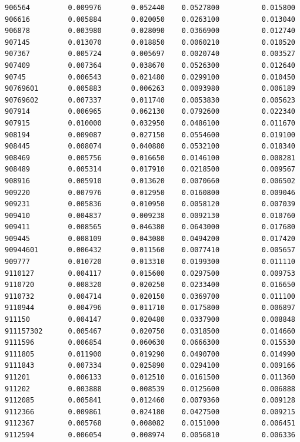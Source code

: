 \documentclass[
  letterpaper,
  DIV=11,
  numbers=noendperiod]{scrartcl}
\begin{document}
\begin{verbatim}
906564         0.009976       0.052440    0.0527800          0.015800
906616         0.005884       0.020050    0.0263100          0.013040
906878         0.003980       0.028090    0.0366900          0.012740
907145         0.013070       0.018850    0.0060210          0.010520
907367         0.005724       0.005697    0.0020740          0.003527
907409         0.007364       0.038670    0.0526300          0.012640
90745          0.006543       0.021480    0.0299100          0.010450
90769601       0.005883       0.006263    0.0093980          0.006189
90769602       0.007337       0.011740    0.0053830          0.005623
907914         0.006965       0.062130    0.0792600          0.022340
907915         0.010000       0.032950    0.0486100          0.011670
908194         0.009087       0.027150    0.0554600          0.019100
908445         0.008074       0.040880    0.0532100          0.018340
908469         0.005756       0.016650    0.0146100          0.008281
908489         0.005314       0.017910    0.0218500          0.009567
908916         0.005910       0.013620    0.0070660          0.006502
909220         0.007976       0.012950    0.0160800          0.009046
909231         0.005836       0.010950    0.0058120          0.007039
909410         0.004837       0.009238    0.0092130          0.010760
909411         0.008565       0.046380    0.0643000          0.017680
909445         0.008109       0.043080    0.0494200          0.017420
90944601       0.006432       0.011560    0.0077410          0.005657
909777         0.010720       0.013310    0.0199300          0.011110
9110127        0.004117       0.015600    0.0297500          0.009753
9110720        0.008320       0.020250    0.0233400          0.016650
9110732        0.004714       0.020150    0.0369700          0.011100
9110944        0.004796       0.011710    0.0175800          0.006897
911150         0.004147       0.020480    0.0337900          0.008848
911157302      0.005467       0.020750    0.0318500          0.014660
9111596        0.006854       0.060630    0.0666300          0.015530
9111805        0.011900       0.019290    0.0490700          0.014990
9111843        0.007334       0.025890    0.0294100          0.009166
911201         0.006133       0.012510    0.0161500          0.011360
911202         0.003888       0.008539    0.0125600          0.006888
9112085        0.005841       0.012460    0.0079360          0.009128
9112366        0.009861       0.024180    0.0427500          0.009215
9112367        0.005768       0.008082    0.0151000          0.006451
9112594        0.006054       0.008974    0.0056810          0.006336

\end{verbatim}
\end{document}
